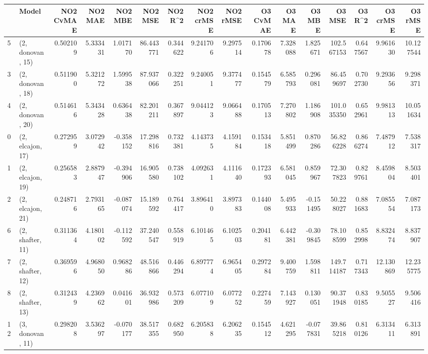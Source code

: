 \begin{tabular}{llrrrrrrrrrrrrrr}
\toprule
{} &             Model &  NO2 CvMAE &   NO2 MAE &   NO2 MBE &    NO2 MSE &   NO2 R\textasciicircum2 &  NO2 crMSE &  NO2 rMSE &  O3 CvMAE &    O3 MAE &    O3 MBE &      O3 MSE &    O3 R\textasciicircum2 &   O3 crMSE &    O3 rMSE \\
\midrule
5  &  (2, donovan, 15) &   0.502109 &  5.333431 &  1.017170 &  86.443771 &  0.344622 &   9.241706 &  9.297514 &  0.170678 &  7.328088 &  1.825671 &  102.567153 &  0.647567 &   9.961630 &  10.127544 \\
3  &  (2, donovan, 18) &   0.511900 &  5.321272 &  1.599538 &  87.937066 &  0.322251 &   9.240051 &  9.377477 &  0.154579 &  6.585793 &  0.296081 &   86.459697 &  0.702730 &   9.293656 &   9.298371 \\
4  &  (2, donovan, 20) &   0.514616 &  5.343428 &  0.636438 &  82.201211 &  0.367897 &   9.044123 &  9.066488 &  0.170513 &  7.270802 &  1.186908 &  101.035350 &  0.652961 &   9.981313 &  10.051634 \\
0  &  (2, elcajon, 17) &   0.272959 &  3.072942 & -0.358152 &  17.298816 &  0.732381 &   4.143735 &  4.159184 &  0.153418 &  5.851499 &  0.870286 &   56.826228 &  0.866274 &   7.487912 &   7.538317 \\
1  &  (2, elcajon, 19) &   0.256583 &  2.887947 & -0.394906 &  16.905580 &  0.738102 &   4.092631 &  4.111640 &  0.172393 &  6.581045 &  0.859967 &   72.307823 &  0.829761 &   8.459804 &   8.503401 \\
2  &  (2, elcajon, 21) &   0.248716 &  2.793165 & -0.087074 &  15.189592 &  0.764417 &   3.896410 &  3.897383 &  0.144008 &  5.495933 & -0.151495 &   50.228027 &  0.881683 &   7.085554 &   7.087173 \\
6  &  (2, shafter, 11) &   0.311364 &  4.180102 & -0.112592 &  37.240547 &  0.558919 &   6.101465 &  6.102503 &  0.204181 &  6.442381 & -0.309845 &   78.108599 &  0.852998 &   8.832474 &   8.837907 \\
7  &  (2, shafter, 12) &   0.369596 &  4.968050 &  0.968286 &  48.516866 &  0.446294 &   6.897774 &  6.965405 &  0.297284 &  9.400759 &  1.598811 &  149.714187 &  0.717343 &  12.130869 &  12.235775 \\
8  &  (2, shafter, 13) &   0.312439 &  4.236962 &  0.041601 &  36.932986 &  0.573209 &   6.077109 &  6.077252 &  0.227459 &  7.143927 &  0.130051 &   90.371948 &  0.830185 &   9.505527 &   9.506416 \\
12 &  (3, donovan, 11) &   0.298208 &  3.536297 & -0.070177 &  38.517355 &  0.682950 &   6.205838 &  6.206235 &  0.154512 &  4.621295 & -0.077831 &   39.865218 &  0.810126 &   6.313411 &   6.313891 \\

\end{tabular}
